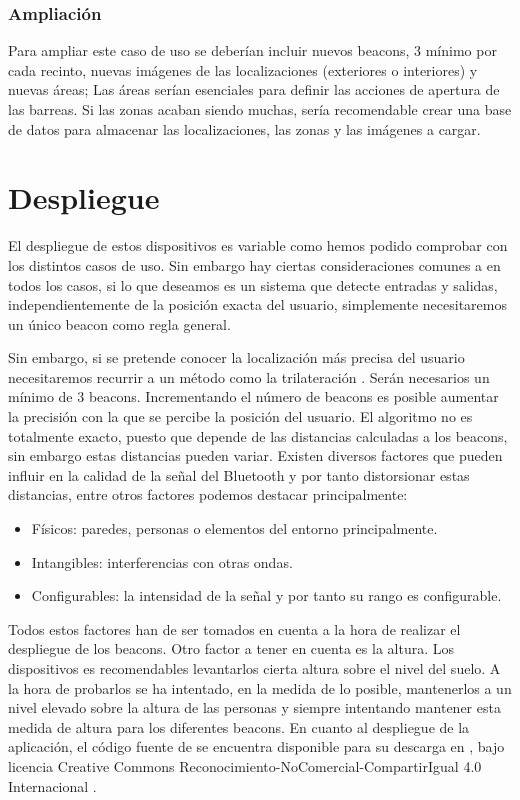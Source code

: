 \subsubsection{Ampliación}

Para ampliar este caso de uso se deberían incluir nuevos beacons, 3 mínimo por cada recinto, nuevas imágenes de las localizaciones (exteriores o interiores) y nuevas áreas; Las áreas serían esenciales para definir las acciones de apertura de las barreas. Si las zonas acaban siendo muchas, sería recomendable crear una base de datos  para almacenar las localizaciones, las zonas y las imágenes a cargar.

\section{Despliegue}

El despliegue de estos dispositivos es variable como hemos podido comprobar con los distintos casos de uso. Sin embargo hay ciertas consideraciones comunes a en todos los casos, si lo que deseamos es un sistema que detecte entradas y salidas, independientemente de la posición exacta del usuario, simplemente necesitaremos un único beacon como regla general. 


Sin embargo, si se pretende conocer la localización más precisa del usuario necesitaremos recurrir a un método como la trilateración \cite{URL::trilateracion}. Serán necesarios un mínimo de 3 beacons. Incrementando el número de beacons es posible aumentar la precisión con la que se percibe la posición del usuario. El algoritmo no es totalmente exacto, puesto que depende de las distancias calculadas a los beacons, sin embargo estas distancias pueden variar. Existen diversos factores que pueden influir en la calidad de la señal del Bluetooth y por tanto distorsionar estas distancias, entre otros factores podemos destacar principalmente:


\begin{itemize}
\item Físicos:  paredes, personas o elementos del entorno principalmente.
\item Intangibles: interferencias con otras ondas.
\item Configurables: la intensidad de la señal y por tanto su rango es configurable.
\end{itemize}


Todos estos factores han de ser tomados en cuenta a la hora de realizar el despliegue de los beacons. Otro factor a tener en cuenta es la altura. Los dispositivos es recomendables levantarlos cierta altura sobre el nivel del suelo. A la hora de probarlos se ha intentado, en la medida de lo posible, mantenerlos a un nivel elevado sobre la altura de las personas y siempre intentando mantener esta medida de altura para los diferentes beacons. En cuanto al despliegue de la aplicación, el código fuente de \BulletPoint{} se encuentra disponible para su descarga en \cite{URL::repositorioAplicacion}, bajo licencia Creative Commons Reconocimiento-NoComercial-CompartirIgual 4.0 Internacional \cite{URL::licencia}.





